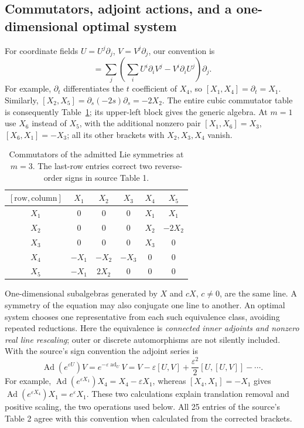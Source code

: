 \subsection{Commutators, adjoint actions, and a one-dimensional optimal system}
For coordinate fields $U=U^j\partial_j$, $V=V^j\partial_j$, our convention is
\begin{equation}
 [U,V]=\sum_j\left(\sum_i U^i\partial_iV^j
                          -V^i\partial_iU^j\right)\partial_j.
 \label{eq:sve-bracket-rule}
\end{equation}
For example, $\partial_t$ differentiates the $t$ coefficient of $X_4$,
so $[X_1,X_4]=\partial_t=X_1$. Similarly,
$[X_2,X_5]=\partial_s(-2s)\partial_s=-2X_2$.
The entire cubic commutator table is consequently
Table~\ref{tab:sve-repro-brackets}; its upper-left block gives the generic
algebra. At $m=1$ use $X_6$ instead of $X_5$, with the additional nonzero
pair $[X_1,X_6]=X_3$, $[X_6,X_1]=-X_3$; all its other brackets with
$X_2,X_3,X_4$ vanish.
\begin{table}[htbp]
\centering\small
\begin{tabular}{@{}c|ccccc@{}}
\toprule
$[\text{row},\text{column}]$ & $X_1$ & $X_2$ & $X_3$ & $X_4$ & $X_5$\\
\midrule
$X_1$ & $0$ & $0$ & $0$ & $X_1$ & $X_1$\\
$X_2$ & $0$ & $0$ & $0$ & $X_2$ & $-2X_2$\\
$X_3$ & $0$ & $0$ & $0$ & $X_3$ & $0$\\
$X_4$ & $-X_1$ & $-X_2$ & $-X_3$ & $0$ & $0$\\
$X_5$ & $-X_1$ & $2X_2$ & $0$ & $0$ & $0$\\
\bottomrule
\end{tabular}
\caption{Commutators of the admitted Lie symmetries at $m=3$.
The last-row entries correct two reverse-order signs in source Table 1.}
\label{tab:sve-repro-brackets}
\end{table}

One-dimensional subalgebras generated by $X$ and $cX$, $c\ne0$, are the
same line. A symmetry of the equation may also conjugate one line to
another. An optimal system chooses one representative from each such
equivalence class, avoiding repeated reductions. Here the equivalence is
\emph{connected inner adjoints and nonzero real line rescaling}; outer or
discrete automorphisms are not silently included. With the source's sign
convention the adjoint series is
\begin{equation}
 \operatorname{Ad}(e^{\varepsilon U})V
 =e^{-\varepsilon\operatorname{ad}_U}V
 =V-\varepsilon[U,V]+\frac{\varepsilon^2}{2}[U,[U,V]]-\cdots.
 \label{eq:sve-adjoint-series}
\end{equation}
For example,
$\operatorname{Ad}(e^{\varepsilon X_1})X_4=X_4-\varepsilon X_1$,
whereas $[X_4,X_1]=-X_1$ gives
$\operatorname{Ad}(e^{\varepsilon X_4})X_1=e^\varepsilon X_1$.
These two calculations explain translation removal and positive scaling,
the two operations used below. All 25 entries of the source's Table 2
agree with this convention when calculated from the corrected brackets.

